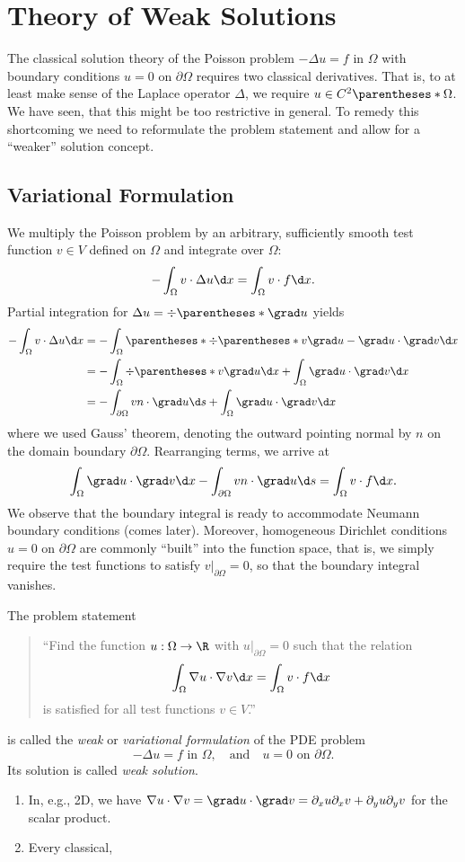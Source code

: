 \section{Theory of Weak Solutions}

The classical solution theory of the Poisson problem \(-\Delta u = f\) in \(\Omega\) with boundary conditions \(u = 0\) on \(\partial\Omega\) requires two classical derivatives.
That is, to at least make sense of the Laplace operator \(\Delta\), we require \(u \in C^2\parentheses*{\Omega}\).
We have seen, that this might be too restrictive in general.
To remedy this shortcoming we need to reformulate the problem statement and allow for a ``weaker'' solution concept.


\subsection{Variational Formulation}

We multiply the Poisson problem by an arbitrary, sufficiently smooth test function \(v \in V\) defined on \(\Omega\) and integrate over \(\Omega\):
\[
	-\int_\Omega v \cdot \Delta u\d x = \int_\Omega v \cdot f\d x.
\]
Partial integration for \(\Delta u = \div\parentheses*{\grad u}\) yields
\begin{align*}
	-\int_\Omega v \cdot \Delta u\d x &= -\int_\Omega \parentheses*{\div\parentheses*{v\grad u} - \grad u \cdot \grad v}\d x\\
	&= -\int_\Omega \div\parentheses*{v\grad u}\d x + \int_\Omega \grad u \cdot \grad v\d x\\
	&= -\int_{\partial\Omega}vn \cdot \grad u\d s + \int_\Omega \grad u \cdot \grad v\d x
\end{align*}
where we used Gauss' theorem, denoting the outward pointing normal by \(n\) on the domain boundary \(\partial\Omega\).
Rearranging terms, we arrive at
\[
	\int_\Omega \grad u \cdot \grad v\d x - \int_{\partial\Omega}vn \cdot \grad u\d s = \int_\Omega v \cdot f\d x.
\]
We observe that the boundary integral is ready to accommodate Neumann boundary conditions (comes later).
Moreover, homogeneous Dirichlet conditions \(u = 0\) on \(\partial\Omega\) are commonly ``built'' into the function space, that is, we simply require the test functions to satisfy \(\left.v\right|_{\partial\Omega} = 0\), so that the boundary integral vanishes.

\begin{definition}
	The problem statement
	\begin{quote}
		``Find the function \(u: \Omega \to \R\) with \(\left.u\right|_{\partial\Omega} = 0\) such that the relation
		\[
			\int_\Omega \nabla u \cdot \nabla v\d x = \int_\Omega v \cdot f\d x
		\]
		is satisfied for all test functions \(v \in V\).''
	\end{quote}
	is called the \emph{weak} or \emph{variational formulation} of the PDE problem
	\[
		-\Delta u = f\text{ in }\Omega, \quad \text{and} \quad u = 0\text{ on }\partial\Omega.
	\]
	Its solution is called \emph{weak solution}.
\end{definition}

\begin{remark}
	\begin{enumerate}
		\item In, e.g., 2D, we have \(\nabla u \cdot \nabla v = \grad u \cdot \grad v = \partial_x u \partial_x v + \partial_y u\partial_y v\) for the scalar product.
		\item Every classical, 
	\end{enumerate}
\end{remark}
